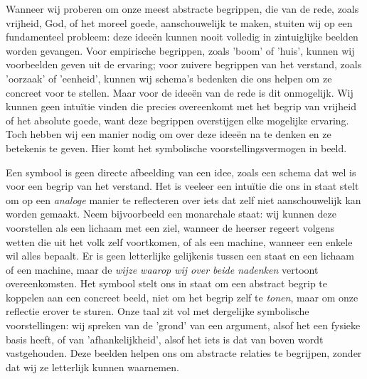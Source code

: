 \begin{mdframed}[leftmargin=0pt,rightmargin=0pt,backgroundcolor=blue!6,linecolor=white,innertopmargin=6pt,innerbottommargin=6pt]

Wanneer wij proberen om onze meest abstracte begrippen, die van de rede, zoals vrijheid, God, of het moreel goede, aanschouwelijk te maken, stuiten wij op een fundamenteel probleem: deze ideeën kunnen nooit volledig in zintuiglijke beelden worden gevangen. Voor empirische begrippen, zoals 'boom' of 'huis', kunnen wij voorbeelden geven uit de ervaring; voor zuivere begrippen van het verstand, zoals 'oorzaak' of 'eenheid', kunnen wij schema's bedenken die ons helpen om ze concreet voor te stellen. Maar voor de ideeën van de rede is dit onmogelijk. Wij kunnen geen intuïtie vinden die precies overeenkomt met het begrip van vrijheid of het absolute goede, want deze begrippen overstijgen elke mogelijke ervaring. Toch hebben wij een manier nodig om over deze ideeën na te denken en ze betekenis te geven. Hier komt het symbolische voorstellingsvermogen in beeld.

Een symbool is geen directe afbeelding van een idee, zoals een schema dat wel is voor een begrip van het verstand. Het is veeleer een intuïtie die ons in staat stelt om op een \textit{analoge} manier te reflecteren over iets dat zelf niet aanschouwelijk kan worden gemaakt. Neem bijvoorbeeld een monarchale staat: wij kunnen deze voorstellen als een lichaam met een ziel, wanneer de heerser regeert volgens wetten die uit het volk zelf voortkomen, of als een machine, wanneer een enkele wil alles bepaalt. Er is geen letterlijke gelijkenis tussen een staat en een lichaam of een machine, maar de \textit{wijze waarop wij over beide nadenken} vertoont overeenkomsten. Het symbool stelt ons in staat om een abstract begrip te koppelen aan een concreet beeld, niet om het begrip zelf te \textit{tonen}, maar om onze reflectie erover te sturen. Onze taal zit vol met dergelijke symbolische voorstellingen: wij spreken van de 'grond' van een argument, alsof het een fysieke basis heeft, of van 'afhankelijkheid', alsof het iets is dat van boven wordt vastgehouden. Deze beelden helpen ons om abstracte relaties te begrijpen, zonder dat wij ze letterlijk kunnen waarnemen.


\end{mdframed}
